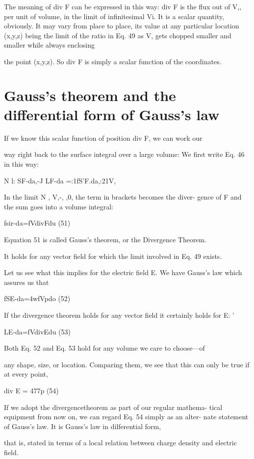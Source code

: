 The meaning of div F can be expressed in this way: div F is the
flux out of V,, per unit of volume, in the limit of infinitesimal Vi. It
is a scalar quantity, obviously. It may vary from place to place, its
value at any particular location (x,y,z) being the limit of the ratio in
Eq. 49 as V, gets chopped smaller and smaller while always enclosing

the point (x,y,z). So div F is simply a scalar function of the
coordinates.

\section{Gauss's theorem and the differential form of Gauss's law}

If we know this scalar function of position div F, we can work our

way right back to the surface integral over a large volume: We first
write Eq. 46 in this way:

N l: SF-da,-J
LF-da =:1fS'F.da,:21V,~  

In the limit N , V,-, \rightarrow,0, the term in brackets becomes the diver-
gence of F and the sum goes into a volume integral:

fsir-da=fVdivFdu (51)

Equation 51 is called Gauss's theorem, or the Divergence Theorem.

It holds for any vector field for which the limit involved in Eq. 49
exists.

Let us see what this implies for the electric field E. We have
Gauss's law which assures us that

fSE-da=4wfVpdo (52)

If the divergence theorem holds for any vector field it certainly holds
for E: '

LE-da=fVdivEdu (53)

Both Eq. 52 and Eq. 53 hold for any volume we care to choose---of

any shape, size, or location. Comparing them, we see that this can
only be true if at every point,

div E = 477p (54)

If we adopt the divergencetheorem as part of our regular mathema-
tical equipment from now on, we can regard Eq. 54 simply as an alter-
nate statement of Gauss's law. It is Gauss's law in dilferential form,

that is, stated in terms of a local relation between charge density and
electric field.

